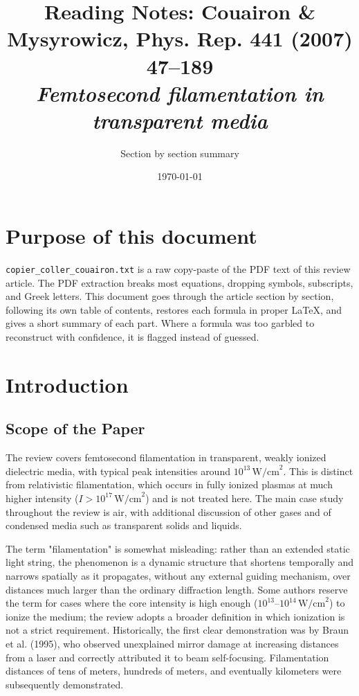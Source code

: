 \documentclass[11pt,a4paper]{article}
\title{Reading Notes: Couairon \& Mysyrowicz, Phys. Rep. 441 (2007) 47--189\\\emph{Femtosecond filamentation in transparent media}}
\author{Section by section summary}
\date{\today}
\begin{document}
\maketitle
\tableofcontents
\newpage

\section*{Purpose of this document}
\texttt{copier\_coller\_couairon.txt} is a raw copy-paste of the PDF text of this review article. The PDF extraction breaks most equations, dropping symbols, subscripts, and Greek letters. This document goes through the article section by section, following its own table of contents, restores each formula in proper LaTeX, and gives a short summary of each part. Where a formula was too garbled to reconstruct with confidence, it is flagged instead of guessed.

\section{Introduction}

\subsection{Scope of the Paper}
The review covers femtosecond filamentation in transparent, weakly ionized dielectric media, with typical peak intensities around $10^{13}\,\text{W/cm}^2$. This is distinct from relativistic filamentation, which occurs in fully ionized plasmas at much higher intensity ($I>10^{17}\,\text{W/cm}^2$) and is not treated here. The main case study throughout the review is air, with additional discussion of other gases and of condensed media such as transparent solids and liquids.

The term "filamentation" is somewhat misleading: rather than an extended static light string, the phenomenon is a dynamic structure that shortens temporally and narrows spatially as it propagates, without any external guiding mechanism, over distances much larger than the ordinary diffraction length. Some authors reserve the term for cases where the core intensity is high enough ($10^{13}$--$10^{14}\,\text{W/cm}^2$) to ionize the medium; the review adopts a broader definition in which ionization is not a strict requirement. Historically, the first clear demonstration was by Braun et al. (1995), who observed unexplained mirror damage at increasing distances from a laser and correctly attributed it to beam self-focusing. Filamentation distances of tens of meters, hundreds of meters, and eventually kilometers were subsequently demonstrated.
\end{document}
